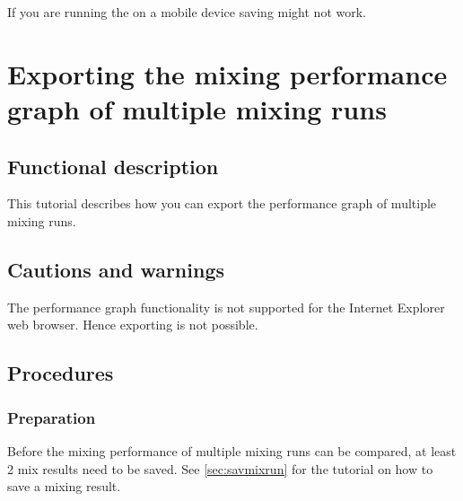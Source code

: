 If you are running the \applicationname{} on a mobile device saving might not work.


\section{Exporting the mixing performance graph of multiple mixing runs}
\label{sec:exportMultiGraph}

\subsection{Functional description}
This tutorial describes how you can export the performance graph of multiple mixing runs.

\subsection{Cautions and warnings}
The performance graph functionality is not supported for the Internet Explorer web browser. Hence exporting is not possible.

\subsection{Procedures}
\subsubsection{Preparation}
Before the mixing performance of multiple mixing runs can be compared, at least 2 mix results need to be saved. See \ref{sec:savmixrun} for the tutorial on how to save a mixing result.

